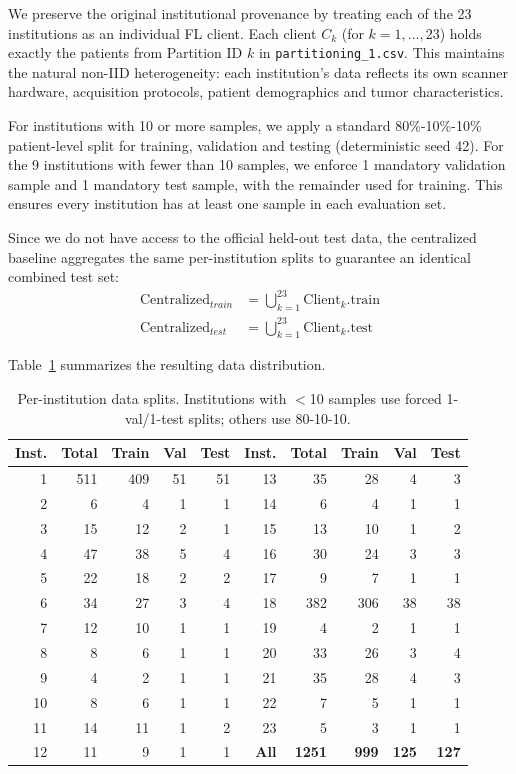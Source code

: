 \documentclass{article}
\begin{document}
We preserve the original institutional provenance by treating each of the 23 institutions as an individual FL client. Each client $C_k$ (for $k = 1, \ldots, 23$) holds exactly the patients from Partition ID $k$ in \texttt{partitioning\_1.csv}. This maintains the natural non-IID heterogeneity: each institution's data reflects its own scanner hardware, acquisition protocols, patient demographics and tumor characteristics.

For institutions with 10 or more samples, we apply a standard 80\%-10\%-10\% patient-level split for training, validation and testing (deterministic seed 42). For the 9 institutions with fewer than 10 samples, we enforce 1 mandatory validation sample and 1 mandatory test sample, with the remainder used for training. This ensures every institution has at least one sample in each evaluation set.

Since we do not have access to the official held-out test data, the centralized baseline aggregates the same per-institution splits to guarantee an identical combined test set:
\begin{align*}
    \text{Centralized}_{train} &= \bigcup_{k=1}^{23} \text{Client}_k\text{.train} \\
    \text{Centralized}_{test} &= \bigcup_{k=1}^{23} \text{Client}_k\text{.test}
\end{align*}

Table~\ref{tab:splits} summarizes the resulting data distribution.

\begin{table}[h]
\centering
\small
\begin{tabular}{rrrrrrrrrr}
\toprule
\textbf{Inst.} & \textbf{Total} & \textbf{Train} & \textbf{Val} & \textbf{Test} &
\textbf{Inst.} & \textbf{Total} & \textbf{Train} & \textbf{Val} & \textbf{Test} \\
\midrule
1  & 511 & 409 & 51 & 51 & 13 & 35 & 28 & 4 & 3 \\
2  &   6 &   4 &  1 &  1 & 14 &  6 &  4 & 1 & 1 \\
3  &  15 &  12 &  2 &  1 & 15 & 13 & 10 & 1 & 2 \\
4  &  47 &  38 &  5 &  4 & 16 & 30 & 24 & 3 & 3 \\
5  &  22 &  18 &  2 &  2 & 17 &  9 &  7 & 1 & 1 \\
6  &  34 &  27 &  3 &  4 & 18 &382 &306 &38 &38 \\
7  &  12 &  10 &  1 &  1 & 19 &  4 &  2 & 1 & 1 \\
8  &   8 &   6 &  1 &  1 & 20 & 33 & 26 & 3 & 4 \\
9  &   4 &   2 &  1 &  1 & 21 & 35 & 28 & 4 & 3 \\
10 &   8 &   6 &  1 &  1 & 22 &  7 &  5 & 1 & 1 \\
11 &  14 &  11 &  1 &  2 & 23 &  5 &  3 & 1 & 1 \\
12 &  11 &   9 &  1 &  1 & \textbf{All} & \textbf{1251} & \textbf{999} & \textbf{125} & \textbf{127} \\
\bottomrule
\end{tabular}
\caption{Per-institution data splits. Institutions with $<$10 samples use forced 1-val/1-test splits; others use 80-10-10.}
\label{tab:splits}
\end{table}
\end{document}
